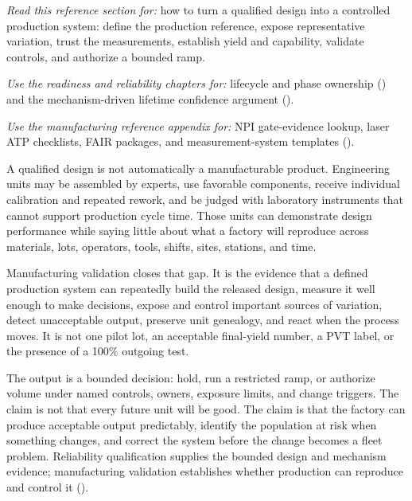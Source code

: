 

\textit{Read this reference section for:} how to turn a qualified design into a controlled
production system: define the production reference, expose representative
variation, trust the measurements, establish yield and capability, validate
controls, and authorize a bounded ramp.

\textit{Use the readiness and reliability chapters for:} lifecycle and phase
ownership () and the mechanism-driven
lifetime confidence argument ().

\textit{Use the manufacturing reference appendix for:} NPI gate-evidence
lookup, laser ATP checklists, FAIR packages, and measurement-system templates
().

A qualified design is not automatically a manufacturable product. Engineering
units may be assembled by experts, use favorable components, receive individual
calibration and repeated rework, and be judged with laboratory instruments that
cannot support production cycle time. Those units can demonstrate design
performance while saying little about what a factory will reproduce across
materials, lots, operators, tools, shifts, sites, stations, and time.

Manufacturing validation closes that gap. It is the evidence that a defined
production system can repeatedly build the released design, measure it well
enough to make decisions, expose and control important sources of variation,
detect unacceptable output, preserve unit genealogy, and react when the process
moves. It is not one pilot lot, an acceptable final-yield number, a PVT label,
or the presence of a 100\% outgoing test.

The output is a bounded decision: hold, run a restricted ramp, or authorize
volume under named controls, owners, exposure limits, and change triggers. The
claim is not that every future unit will be good. The claim is that the factory
can produce acceptable output predictably, identify the population at risk when
something changes, and correct the system before the change becomes a fleet
problem. Reliability qualification supplies the bounded design and
mechanism evidence; manufacturing validation establishes whether production can
reproduce and control it ().

